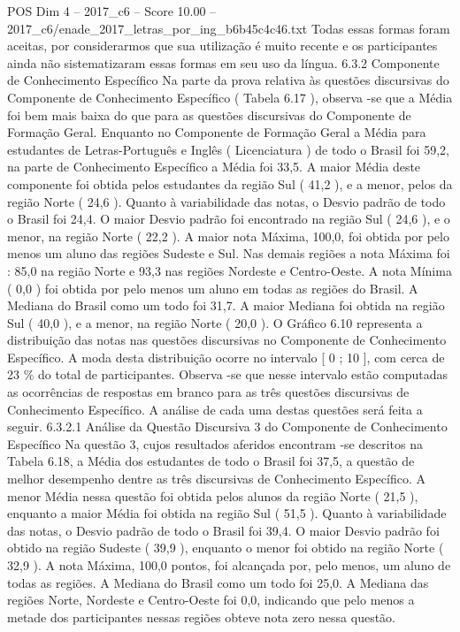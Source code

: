 \begin{textsample}{POS Dim 4 – 2017\_c6 – Score 10.00 – 2017\_c6/enade\_2017\_letras\_por\_ing\_b6b45c4c46.txt}
Todas essas formas foram aceitas, por considerarmos que sua utilização é muito recente e os participantes ainda não sistematizaram essas formas em seu uso da língua. 6.3.2 Componente de Conhecimento Específico Na parte da prova relativa às questões discursivas do Componente de Conhecimento Específico ( Tabela 6.17 ), observa -se que a Média foi bem mais baixa do que para as questões discursivas do Componente de Formação Geral.
Enquanto no Componente de Formação Geral a Média para estudantes de Letras-Português e Inglês ( Licenciatura ) de todo o Brasil foi 59,2, na parte de Conhecimento Específico a Média foi 33,5.
A maior Média deste componente foi obtida pelos estudantes da região Sul ( 41,2 ), e a menor, pelos da região Norte ( 24,6 ).
Quanto à variabilidade das notas, o Desvio padrão de todo o Brasil foi 24,4.
O maior Desvio padrão foi encontrado na região Sul ( 24,6 ), e o menor, na região Norte ( 22,2 ).
A maior nota Máxima, 100,0, foi obtida por pelo menos um aluno das regiões Sudeste e Sul.
Nas demais regiões a nota Máxima foi : 85,0 na região Norte e 93,3 nas regiões Nordeste e Centro-Oeste.
A nota Mínima ( 0,0 ) foi obtida por pelo menos um aluno em todas as regiões do Brasil.
A Mediana do Brasil como um todo foi 31,7.
A maior Mediana foi obtida na região Sul ( 40,0 ), e a menor, na região Norte ( 20,0 ).
O Gráfico 6.10 representa a distribuição das notas nas questões discursivas no Componente de Conhecimento Específico.
A moda desta distribuição ocorre no intervalo [ 0 ; 10 ], com cerca de 23 \% do total de participantes.
Observa -se que nesse intervalo estão computadas as ocorrências de respostas em branco para as três questões discursivas de Conhecimento Específico.
A análise de cada uma destas questões será feita a seguir. 6.3.2.1 Análise da Questão Discursiva 3 do Componente de Conhecimento Específico Na questão 3, cujos resultados aferidos encontram -se descritos na Tabela 6.18, a Média dos estudantes de todo o Brasil foi 37,5, a questão de melhor desempenho dentre as três discursivas de Conhecimento Específico.
A menor Média nessa questão foi obtida pelos alunos da região Norte ( 21,5 ), enquanto a maior Média foi obtida na região Sul ( 51,5 ).
Quanto à variabilidade das notas, o Desvio padrão de todo o Brasil foi 39,4.
O maior Desvio padrão foi obtido na região Sudeste ( 39,9 ), enquanto o menor foi obtido na região Norte ( 32,9 ).
A nota Máxima, 100,0 pontos, foi alcançada por, pelo menos, um aluno de todas as regiões.
A Mediana do Brasil como um todo foi 25,0.
A Mediana das regiões Norte, Nordeste e Centro-Oeste foi 0,0, indicando que pelo menos a metade dos participantes nessas regiões obteve nota zero nessa questão.

\end{textsample}
